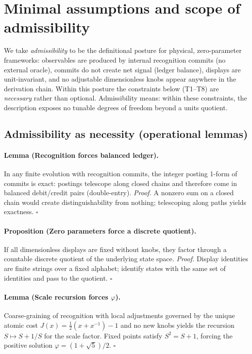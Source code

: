 \documentclass[11pt]{article}
\begin{document}
\section{Minimal assumptions and scope of admissibility}
We take \emph{admissibility} to be the definitional posture for physical, zero\mbox{-}parameter frameworks: observables are produced by internal recognition commits (no external oracle), commits do not create net signal (ledger balance), displays are unit\mbox{-}invariant, and no adjustable dimensionless knobs appear anywhere in the derivation chain. Within this posture the constraints below (T1--T8) are \emph{necessary} rather than optional. Admissibility means: within these constraints, the description exposes no tunable degrees of freedom beyond a units quotient.

\subsection{Admissibility as necessity (operational lemmas)}
\paragraph{Lemma (Recognition forces balanced ledger).} In any finite evolution with recognition commits, the integer posting 1\mbox{-}form of commits is exact: postings telescope along closed chains and therefore come in balanced debit/credit pairs (double\mbox{-}entry). \emph{Proof.} A nonzero sum on a closed chain would create distinguishability from nothing; telescoping along paths yields exactness. \hfill$\square$

\paragraph{Proposition (Zero parameters force a discrete quotient).} If all dimensionless displays are fixed without knobs, they factor through a countable discrete quotient of the underlying state space. \emph{Proof.} Display identities are finite strings over a fixed alphabet; identify states with the same set of identities and pass to the quotient. \hfill$\square$

\paragraph{Lemma (Scale recursion forces $\varphi$).} Coarse\mbox{-}graining of recognition with local adjustments governed by the unique atomic cost \(J(x)=\tfrac12(x+x^{-1})-1\) and no new knobs yields the recursion \(S\mapsto S+1/S\) for the scale factor. Fixed points satisfy \(S^2=S+1\), forcing the positive solution \(\varphi=(1+\sqrt{5})/2\). \hfill$\square$
\end{document}
